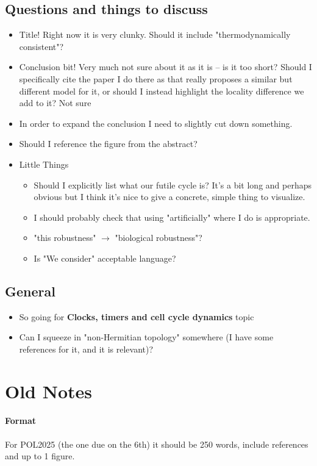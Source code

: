 \documentclass[11pt]{article}
\begin{document}
\subsection{Questions and things to discuss}
\begin{itemize}
	\item Title! Right now it is very clunky. Should it include "thermodynamically consistent"?
	\item Conclusion bit! Very much not sure about it as it is -- is it too short? Should I specifically cite the paper I do there as that really proposes a similar but different model for it, or should I instead highlight the locality difference we add to it? Not sure
	\item In order to expand the conclusion I need to slightly cut down something.
	\item Should I reference the figure from the abstract?
	\item Little Things \begin{itemize}
		      \item Should I explicitly list what our futile cycle is? It's a bit long and perhaps obvious but I think it's nice to give a concrete, simple thing to visualize.
		      \item I should probably check that using "artificially" where I do is appropriate.
		      \item "this robustness" $\rightarrow$ "biological robustness"?
		      \item Is "We consider" acceptable language?
	      \end{itemize}
\end{itemize}

\subsection{General}
\begin{itemize}
	\item So going for \textbf{Clocks, timers and cell cycle dynamics} topic
	\item Can I squeeze in "non-Hermitian topology" somewhere (I have some references for it, and it is relevant)?
\end{itemize}

\newpage
\section{Old Notes}
\paragraph{Format}
For POL2025 (the one due on the 6th) it should be 250 words, include references and up to 1 figure.
\end{document}

